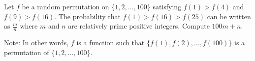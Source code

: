 Let $f$ be a random permutation on $\{1, 2, \dots, 100\}$ satisfying $f(1) > f(4)$ and $f(9)>f(16)$. The probability that $f(1)>f(16)>f(25)$ can be written as $\frac mn$ where $m$ and $n$ are relatively prime positive integers. Compute $100m+n$.

Note: In other words, $f$ is a function such that $\{f(1), f(2), \ldots, f(100)\}$ is a permutation of $\{1,2, \ldots, 100\}$.
